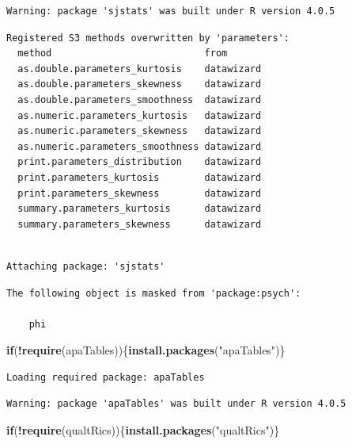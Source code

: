 \documentclass[
  english,
]{book}
\newenvironment{Shaded}{\begin{snugshade}}{\end{snugshade}}
\newcommand{\ControlFlowTok}[1]{\textcolor[rgb]{0.13,0.29,0.53}{\textbf{#1}}}
\newcommand{\KeywordTok}[1]{\textcolor[rgb]{0.13,0.29,0.53}{\textbf{#1}}}
\newcommand{\NormalTok}[1]{#1}
\newcommand{\OperatorTok}[1]{\textcolor[rgb]{0.81,0.36,0.00}{\textbf{#1}}}
\newcommand{\StringTok}[1]{\textcolor[rgb]{0.31,0.60,0.02}{#1}}
\begin{document}
\begin{verbatim}
Warning: package 'sjstats' was built under R version 4.0.5
\end{verbatim}

\begin{verbatim}
Registered S3 methods overwritten by 'parameters':
  method                           from      
  as.double.parameters_kurtosis    datawizard
  as.double.parameters_skewness    datawizard
  as.double.parameters_smoothness  datawizard
  as.numeric.parameters_kurtosis   datawizard
  as.numeric.parameters_skewness   datawizard
  as.numeric.parameters_smoothness datawizard
  print.parameters_distribution    datawizard
  print.parameters_kurtosis        datawizard
  print.parameters_skewness        datawizard
  summary.parameters_kurtosis      datawizard
  summary.parameters_skewness      datawizard
\end{verbatim}

\begin{verbatim}

Attaching package: 'sjstats'
\end{verbatim}

\begin{verbatim}
The following object is masked from 'package:psych':

    phi
\end{verbatim}

\begin{Shaded}
\begin{Highlighting}[]
\ControlFlowTok{if}\NormalTok{(}\OperatorTok{!}\KeywordTok{require}\NormalTok{(apaTables))\{}\KeywordTok{install.packages}\NormalTok{(}\StringTok{"apaTables"}\NormalTok{)\}}
\end{Highlighting}
\end{Shaded}

\begin{verbatim}
Loading required package: apaTables
\end{verbatim}

\begin{verbatim}
Warning: package 'apaTables' was built under R version 4.0.5
\end{verbatim}

\begin{Shaded}
\begin{Highlighting}[]
\ControlFlowTok{if}\NormalTok{(}\OperatorTok{!}\KeywordTok{require}\NormalTok{(qualtRics))\{}\KeywordTok{install.packages}\NormalTok{(}\StringTok{"qualtRics"}\NormalTok{)\}}
\end{Highlighting}
\end{Shaded}
\end{document}
